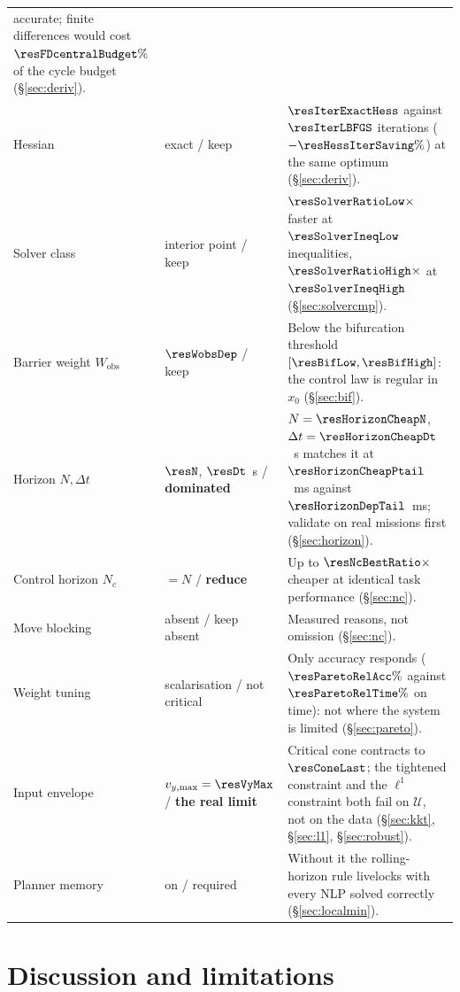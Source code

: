 \documentclass[11pt,a4paper]{article}
\newcommand{\Wobs}{W_{\mathrm{obs}}}
\newcommand{\Ninput}{N_c}
\begin{document}
\begin{table}[htbp]
\begin{tabular}{p{}p{}p{}}
      accurate; finite differences would cost $\resFDcentralBudget\%$ of the cycle budget
      (\S\ref{sec:deriv}). \\
    Hessian & exact / keep & $\resIterExactHess$ against $\resIterLBFGS$ iterations
      ($-\resHessIterSaving\%$) at the same optimum (\S\ref{sec:deriv}). \\
    Solver class & interior point / keep & $\resSolverRatioLow\times$ faster at $\resSolverIneqLow$
      inequalities, $\resSolverRatioHigh\times$ at $\resSolverIneqHigh$ (\S\ref{sec:solvercmp}). \\
    Barrier weight $\Wobs$ & $\resWobsDep$ / keep & Below the bifurcation threshold
      $[\resBifLow,\resBifHigh]$: the control law is regular in $x_0$ (\S\ref{sec:bif}). \\
    Horizon $N,\Delta t$ & $\resN$, $\resDt$~s / \textbf{dominated} & $N=\resHorizonCheapN$,
      $\Delta t=\resHorizonCheapDt$~s matches it at $\resHorizonCheapPtail$~ms against
      $\resHorizonDepTail$~ms; validate on real missions first (\S\ref{sec:horizon}). \\
    Control horizon $\Ninput$ & $=N$ / \textbf{reduce} & Up to $\resNcBestRatio\times$ cheaper at identical
      task performance (\S\ref{sec:nc}). \\
    Move blocking & absent / keep absent & Measured reasons, not omission (\S\ref{sec:nc}). \\
    Weight tuning & scalarisation / not critical & Only accuracy responds ($\resParetoRelAcc\%$ against
      $\resParetoRelTime\%$ on time): not where the system is limited (\S\ref{sec:pareto}). \\
    Input envelope & $v_{y,\max}=\resVyMax$ / \textbf{the real limit} & Critical cone contracts to
      $\resConeLast$; the tightened constraint and the $\ell^1$ constraint both fail on $\mathcal{U}$, not on
      the data (\S\ref{sec:kkt}, \S\ref{sec:l1}, \S\ref{sec:robust}). \\
    Planner memory & on / required & Without it the rolling-horizon rule livelocks with every NLP solved
      correctly (\S\ref{sec:localmin}). \\
    \bottomrule
  \end{tabular}
\end{table}

\section{Discussion and limitations}
\label{sec:discussion}
\end{document}
